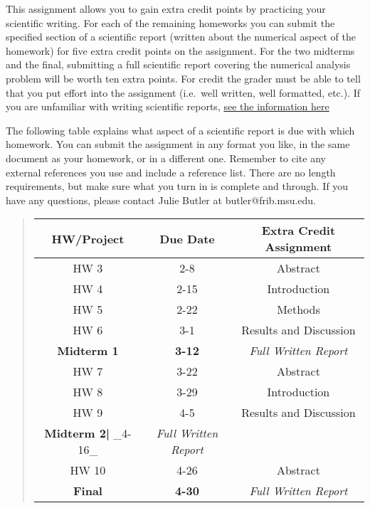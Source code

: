 \documentclass[%
oneside,                 %
final,                   %
10pt]{article}
\begin{document}
This assignment allows you to gain extra credit points by practicing
your scientific writing.  For each of the remaining homeworks you can
submit the specified section of a scientific report (written about the
numerical aspect of the homework) for five extra credit points on the
assignment.  For the two midterms and the final, submitting a full
scientific report covering the numerical analysis problem will be
worth ten extra points.  For credit the grader must be able to tell
that you put effort into the assignment (i.e.~well written, well
formatted, etc.).  If you are unfamiliar with writing scientific
reports, \href{{https://github.com/mhjensen/Physics321/blob/master/doc/Homeworks/ExtraCredits/IntroductionScientificWriting.md}}{see the information here}

The following table explains what aspect of a scientific report is due
with which homework.  You can submit the assignment in any format you
like, in the same document as your homework, or in a different one.
Remember to cite any external references you use and include a
reference list.  There are no length requirements, but make sure what
you turn in is complete and through.  If you have any questions,
please contact Julie Butler at butler@frib.msu.edu.


\begin{quote}
\begin{tabular}{ccc}
\hline
\multicolumn{1}{c}{ HW/Project } & \multicolumn{1}{c}{ Due Date } & \multicolumn{1}{c}{ Extra Credit Assignment } \\
\hline
HW 3                       & 2-8                        & Abstract                   \\
HW 4                       & 2-15                       & Introduction               \\
HW 5                       & 2-22                       & Methods                    \\
HW 6                       & 3-1                        & Results and Discussion     \\
\textbf{Midterm 1}         & \textbf{3-12}              & \emph{Full Written Report} \\
HW 7                       & 3-22                       & Abstract                   \\
HW 8                       & 3-29                       & Introduction               \\
HW 9                       & 4-5                        & Results and Discussion     \\
\textbf{Midterm 2|} _4-16_ & \emph{Full Written Report} \\
HW 10                      & 4-26                       & Abstract                   \\
\textbf{Final}             & \textbf{4-30}              & \emph{Full Written Report} \\
\hline
\end{tabular}
\end{quote}
\end{document}
